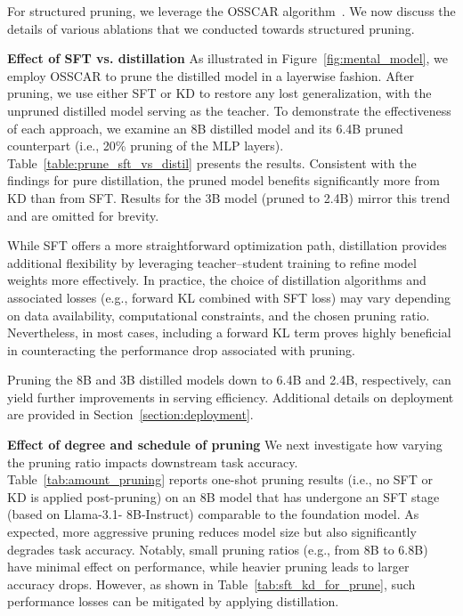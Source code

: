 For structured pruning, we leverage the OSSCAR algorithm~\cite{meng2024osscar}. We now discuss the details of various ablations that we conducted towards structured pruning.




\noindent \textbf{Effect of SFT vs. distillation}
As illustrated in Figure~\ref{fig:mental_model}, we employ OSSCAR to prune the distilled model in a layerwise fashion. After pruning, we use either SFT or KD to restore any lost generalization, with the unpruned distilled model serving as the teacher. To demonstrate the effectiveness of each approach, we examine an 8B distilled model and its 6.4B pruned counterpart (i.e., 20\% pruning of the MLP layers). Table~\ref{table:prune_sft_vs_distil} presents the results. Consistent with the findings for pure distillation, the pruned model benefits significantly more from KD than from SFT. Results for the 3B model (pruned to 2.4B) mirror this trend and are omitted for brevity.

While SFT offers a more straightforward optimization path, distillation provides additional flexibility by leveraging teacher--student training to refine model weights more effectively. In practice, the choice of distillation algorithms and associated losses (e.g., forward KL combined with SFT loss) may vary depending on data availability, computational constraints, and the chosen pruning ratio. Nevertheless, in most cases, including a forward KL term proves highly beneficial in counteracting the performance drop associated with pruning.

Pruning the 8B and 3B distilled models down to 6.4B and 2.4B, respectively, can yield further improvements in serving efficiency. Additional details on deployment are provided in Section~\ref{section:deployment}.

\noindent \textbf{Effect of degree and schedule of pruning}
We next investigate how varying the pruning ratio impacts downstream task accuracy. Table~\ref{tab:amount_pruning} reports one-shot pruning results (i.e., no SFT or KD is applied post-pruning) on an 8B model that has undergone an SFT stage (based on Llama-3.1-
8B-Instruct) comparable to the foundation model. As expected, more aggressive pruning reduces model size but also significantly degrades task accuracy. Notably, small pruning ratios (e.g., from 8B to 6.8B) have minimal effect on performance, while heavier pruning leads to larger accuracy drops. However, as shown in Table~\ref{tab:sft_kd_for_prune}, such performance losses can be mitigated by applying distillation.

